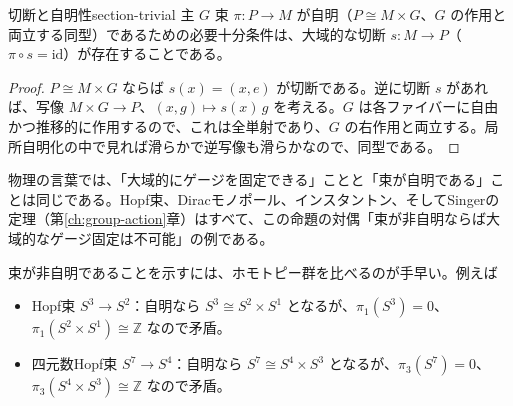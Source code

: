 \documentclass[uplatex, dvipdfmx, book]{jsbook}
\begin{document}
\begin{myprop}{切断と自明性}{section-trivial}
主 $G$ 束 $\pi: P \to M$ が自明（$P \cong M \times G$、$G$ の作用と両立する同型）であるための必要十分条件は、大域的な切断 $s: M \to P$（$\pi \circ s = \mathrm{id}$）が存在することである。
\end{myprop}
\begin{proof}
$P \cong M \times G$ ならば $s(x) = (x, e)$ が切断である。逆に切断 $s$ があれば、写像 $M \times G \to P$、$(x, g) \mapsto s(x)\, g$ を考える。$G$ は各ファイバーに自由かつ推移的に作用するので、これは全単射であり、$G$ の右作用と両立する。局所自明化の中で見れば滑らかで逆写像も滑らかなので、同型である。
\end{proof}
物理の言葉では、「大域的にゲージを固定できる」ことと「束が自明である」ことは同じである。Hopf束、Diracモノポール、インスタントン、そしてSingerの定理（第\ref{ch:group-action}章）はすべて、この命題の対偶「束が非自明ならば大域的なゲージ固定は不可能」の例である。

束が非自明であることを示すには、ホモトピー群を比べるのが手早い。例えば
\begin{itemize}
    \item Hopf束 $S^3 \to S^2$：自明なら $S^3 \cong S^2 \times S^1$ となるが、$\pi_1(S^3) = 0$、$\pi_1(S^2 \times S^1) \cong \mathbb{Z}$ なので矛盾。
    \item 四元数Hopf束 $S^7 \to S^4$：自明なら $S^7 \cong S^4 \times S^3$ となるが、$\pi_3(S^7) = 0$、$\pi_3(S^4 \times S^3) \cong \mathbb{Z}$ なので矛盾。
\end{itemize}
\end{document}

